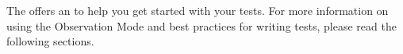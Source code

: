 The \ite{} offers an  to help you get started with your tests. For more information on using the Observation Mode and best practices for writing tests, please read the following sections. 

